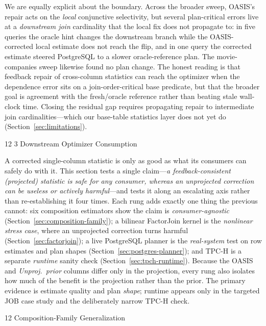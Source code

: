 \documentclass[preprint,12pt]{elsarticle}
\makeatletter
\renewcommand\subsection{\@startsection{subsection}{2}{\z@}%
           {12\p@ \@plus 6\p@ \@minus 3\p@}%
           {3\p@ \@plus 6\p@ \@minus 3\p@}%
           {\normalfont\normalsize\bfseries}}
\renewcommand\subsubsection{\@startsection{subsubsection}{3}{\z@}%
           {12\p@ \@plus 6\p@ \@minus 3\p@}%
           {\p@}%
           {\normalfont\normalsize\bfseries}}
\makeatother
\begin{document}
We are equally explicit about the boundary. Across the broader sweep, OASIS's repair acts on the
\emph{local} conjunctive selectivity, but several plan-critical errors live at a \emph{downstream
join} cardinality that the local fix does not propagate to: in five queries the oracle hint
changes the downstream branch while the OASIS-corrected local estimate does not reach the flip,
and in one query the corrected estimate steered PostgreSQL to a slower oracle-reference plan.
The movie-companies sweep likewise found no plan change. The
honest reading is that feedback repair of cross-column statistics can reach the optimizer when
the dependence error sits on a join-order-critical base predicate, but that the broader goal is
agreement with the fresh/oracle reference rather than beating stale wall-clock time. Closing the
residual gap requires propagating repair to intermediate join cardinalities---which our
base-table statistics layer does not yet do (Section~\ref{sec:limitations}).

\subsection{Downstream Optimizer Consumption}
\label{sec:optimizer-facing}

A corrected single-column statistic is only as good as what its consumers can safely do with
it. This section tests a single claim---\emph{a feedback-consistent (projected) statistic is
safe for any consumer, whereas an unprojected correction can be useless or actively
harmful}---and tests it along an escalating axis rather than re-establishing it four times.
Each rung adds exactly one thing the previous cannot: six composition estimators show the claim
is \emph{consumer-agnostic} (Section~\ref{sec:composition-family}); a bilinear FactorJoin kernel
is the \emph{nonlinear stress case}, where an unprojected correction turns harmful
(Section~\ref{sec:factorjoin}); a live PostgreSQL planner is the \emph{real-system} test on row
estimates and plan shapes (Section~\ref{sec:postgres-planner}); and TPC-H is a separate
\emph{runtime} sanity check (Section~\ref{sec:tpch-runtime}). Because the OASIS and
\emph{Unproj.\ prior} columns differ only in the projection, every rung also isolates how much
of the benefit is the projection rather than the prior. The primary evidence is estimate quality and
plan \emph{shape}; runtime appears only in the targeted JOB case study and the deliberately
narrow TPC-H check.

\subsubsection{Composition-Family Generalization}
\label{sec:composition-family}
\end{document}
